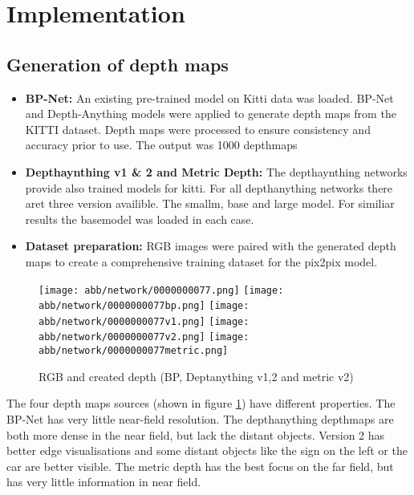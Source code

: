 \section{Implementation}
\subsection{Generation of depth maps}
\begin{itemize}
	\item \textbf{BP-Net:} An existing pre-trained model on Kitti data was loaded. BP-Net and Depth-Anything models were applied to generate depth maps from the KITTI dataset. Depth maps were processed to ensure consistency and accuracy prior to use. The output was 1000 depthmaps
	
	\item \textbf{Depthaynthing v1 \& 2 and Metric Depth:} The depthaynthing networks provide also trained models for kitti. For all depthanything networks there aret three version availible. The smallm, base and large model. For similiar results the basemodel was loaded in each case.   
	
	\item \textbf{Dataset preparation:} RGB images were paired with the generated depth maps to create a comprehensive training dataset for the pix2pix model.
	\end{itemize}
\begin{figure}[!ht]
	\centering
	\texttt{[image: abb/network/0000000077.png]}
	\texttt{[image: abb/network/0000000077bp.png]}
	\texttt{[image: abb/network/0000000077v1.png]}
	\texttt{[image: abb/network/0000000077v2.png]}
	\texttt{[image: abb/network/0000000077metric.png]}
	\caption{RGB and created depth (BP, Deptanything v1,2 and metric v2)}
	\label{all_depths}
\end{figure}
The four depth maps sources (shown in figure \ref{all_depths}) have different properties. The BP-Net has very little near-field resolution. The depthanything depthmaps are both more dense in the near field, but lack the distant objects. Version 2 has better edge visualisations and some distant objects like the sign on the left or the car are better visible. The metric depth has the best focus on the far field, but has very little  information in near field. 

\newpage
